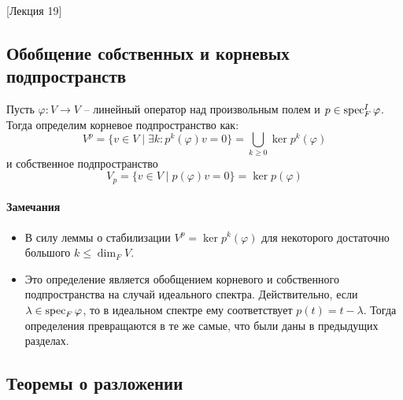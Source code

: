 [Лекция 19]


\subsection{Обобщение собственных и корневых подпространств}

\begin{definition}
Пусть $\varphi\colon V\to V$ -- линейный оператор над произвольным полем и $p\in \operatorname{spec}_F^I \varphi$.
Тогда определим корневое подпространство как:
\[
V^p = \{v\in V\mid \exists k\colon p^k(\varphi) v = 0\} = \bigcup_{k\geqslant 0}\ker p^k(\varphi)
\]
и собственное подпространство
\[
V_p =\{v\in V \mid p(\varphi)v = 0\} = \ker p(\varphi)
\]
\end{definition}

\paragraph{Замечания}

\begin{itemize}
\item В силу леммы о стабилизации $V^p = \ker p^k(\varphi)$ для некоторого достаточно большого $k\leqslant \dim_F V$.

\item Это определение является обобщением корневого и собственного подпространства на случай идеального спектра.
Действительно, если $\lambda\in\operatorname{spec}_F \varphi$, то в идеальном спектре ему соответствует $p(t) = t - \lambda$.
Тогда определения превращаются в те же самые, что были даны в предыдущих разделах.
\end{itemize}

\subsection{Теоремы о разложении}


